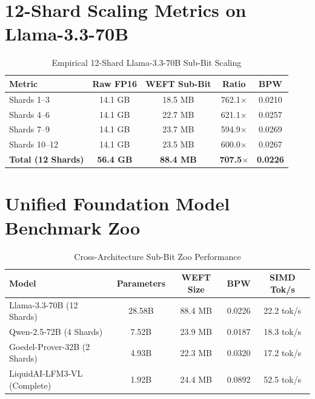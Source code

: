 \documentclass[10pt,journal,compsoc]{IEEEtran}
\begin{document}
\section{12-Shard Scaling Metrics on Llama-3.3-70B}
\begin{table}[h]
\caption{Empirical 12-Shard Llama-3.3-70B Sub-Bit Scaling}
\centering
\begin{tabular}{lcccc}
\toprule
\textbf{Metric} & \textbf{Raw FP16} & \textbf{WEFT Sub-Bit} & \textbf{Ratio} & \textbf{BPW} \\
\midrule
Shards 1--3 & 14.1 GB & 18.5 MB & 762.1$\times$ & 0.0210 \\
Shards 4--6 & 14.1 GB & 22.7 MB & 621.1$\times$ & 0.0257 \\
Shards 7--9 & 14.1 GB & 23.7 MB & 594.9$\times$ & 0.0269 \\
Shards 10--12 & 14.1 GB & 23.5 MB & 600.0$\times$ & 0.0267 \\
\midrule
\textbf{Total (12 Shards)} & \textbf{56.4 GB} & \textbf{88.4 MB} & \textbf{707.5$\times$} & \textbf{0.0226} \\
\bottomrule
\end{tabular}
\end{table}

\section{Unified Foundation Model Benchmark Zoo}
\begin{table}[h]
\caption{Cross-Architecture Sub-Bit Zoo Performance}
\centering
\begin{tabular}{lcccc}
\toprule
\textbf{Model} & \textbf{Parameters} & \textbf{WEFT Size} & \textbf{BPW} & \textbf{SIMD Tok/s} \\
\midrule
Llama-3.3-70B (12 Shards) & 28.58B & 88.4 MB & 0.0226 & 22.2 tok/s \\
Qwen-2.5-72B (4 Shards) & 7.52B & 23.9 MB & 0.0187 & 18.3 tok/s \\
Goedel-Prover-32B (2 Shards) & 4.93B & 22.3 MB & 0.0320 & 17.2 tok/s \\
LiquidAI-LFM3-VL (Complete) & 1.92B & 24.4 MB & 0.0892 & 52.5 tok/s \\
\bottomrule
\end{tabular}
\end{table}
\end{document}
